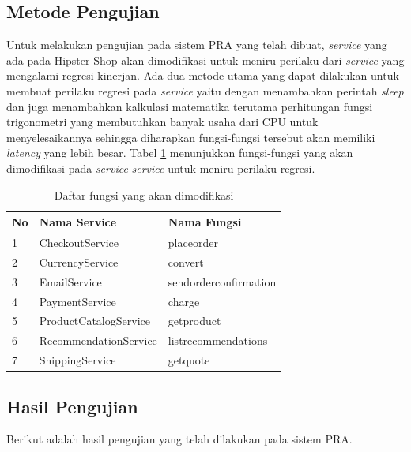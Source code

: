 \subsection{Metode Pengujian}
Untuk melakukan pengujian pada sistem PRA yang telah dibuat, \textit{service} yang ada pada Hipster Shop akan dimodifikasi untuk meniru perilaku dari \textit{service} yang mengalami regresi kinerjan. Ada dua metode utama yang dapat dilakukan untuk membuat perilaku regresi pada \textit{service} yaitu dengan menambahkan perintah \textit{sleep} dan juga menambahkan kalkulasi matematika terutama perhitungan fungsi trigonometri yang membutuhkan banyak usaha dari CPU untuk menyelesaikannya sehingga diharapkan fungsi-fungsi tersebut akan memiliki \textit{latency} yang lebih besar. Tabel \ref{modified-function} menunjukkan fungsi-fungsi yang akan dimodifikasi pada \textit{service}-\textit{service} untuk meniru perilaku regresi.
\begin{small}
	\begin{longtable}{ | p{1cm} | p{5cm} | p{5cm} | }
		\caption{Daftar fungsi yang akan dimodifikasi}
		\label{modified-function}                                                           
		\\ \hline
		\centering\bfseries{No} & \centering\bfseries{Nama Service} & \centering\bfseries{Nama Fungsi} \tabularnewline \hline
		\endfirsthead
		1 & CheckoutService &  placeorder \\ \hline
		2 & CurrencyService &  convert \\ \hline
		3 & EmailService &  sendorderconfirmation \\ \hline
		4 & PaymentService &  charge \\ \hline
		5 & ProductCatalogService &  getproduct \\ \hline
		6 & RecommendationService &  listrecommendations \\ \hline
		7 & ShippingService &  getquote \\ \hline		
	\end{longtable}
\end{small}






\subsection{Hasil Pengujian}
Berikut adalah hasil pengujian yang telah dilakukan pada sistem PRA.
